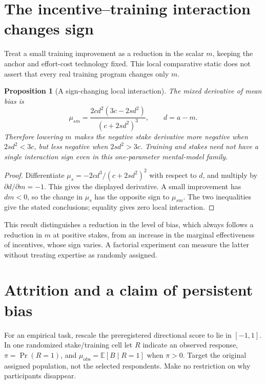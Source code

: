\documentclass[11pt,a4paper]{article}
\newtheorem{proposition}[theorem]{Proposition}
\theoremstyle{definition}
\theoremstyle{remark}
\newcommand{\E}{\mathbb{E}}
\begin{document}
\section{The incentive--training interaction changes sign}
Treat a small training improvement as a reduction in the scalar $m$, keeping the anchor and effort-cost technology fixed. This local comparative static does not assert that every real training program changes only $m$.

\begin{proposition}[A sign-changing local interaction]
The mixed derivative of mean bias is
\[
 \mu_{sm}=\frac{2cd^2(3c-2sd^2)}{(c+2sd^2)^3},\qquad d=a-m.
\]
Therefore lowering $m$ makes the negative stake derivative more negative when $2sd^2<3c$, but less negative when $2sd^2>3c$. Training and stakes need not have a single interaction sign even in this one-parameter mental-model family.
\end{proposition}
\begin{proof}
Differentiate $\mu_s=-2cd^3/(c+2sd^2)^2$ with respect to $d$, and multiply by $\partial d/\partial m=-1$. This gives the displayed derivative. A small improvement has $dm<0$, so the change in $\mu_s$ has the opposite sign to $\mu_{sm}$. The two inequalities give the stated conclusions; equality gives zero local interaction.
\end{proof}

This result distinguishes a reduction in the level of bias, which always follows a reduction in $m$ at positive stakes, from an increase in the marginal effectiveness of incentives, whose sign varies. A factorial experiment can measure the latter without treating expertise as randomly assigned.

\section{Attrition and a claim of persistent bias}
For an empirical task, rescale the preregistered directional score to lie in $[-1,1]$. In one randomized stake/training cell let $R$ indicate an observed response, $\pi=\Pr(R=1)$, and $\mu_{\mathrm{obs}}=\E[B\mid R=1]$ when $\pi>0$. Target the original assigned population, not the selected respondents. Make no restriction on why participants disappear.
\end{document}
